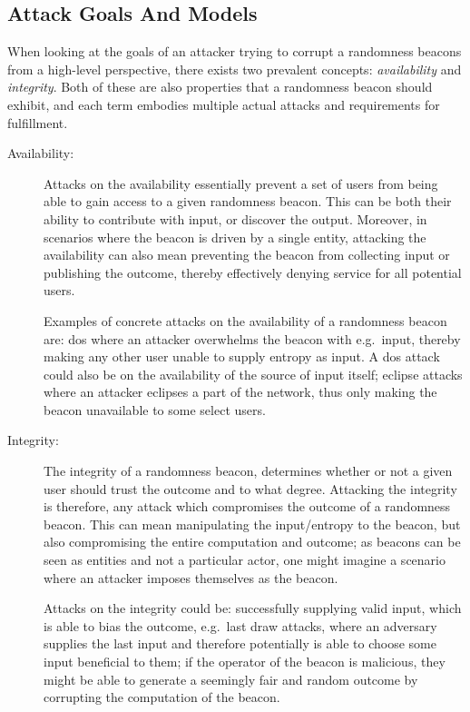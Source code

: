 \subsection{Attack Goals And Models}
\label{sub:attack_goals_and_models}
When looking at the goals of an attacker trying to corrupt a randomness beacons from a high-level perspective, there exists two prevalent concepts: \emph{availability} and \emph{integrity}.
Both of these are also properties that a randomness beacon should exhibit, and each term embodies multiple actual attacks and requirements for fulfillment.

\begin{description}
    \item[Availability:]
        Attacks on the availability essentially prevent a set of users from being able to gain access to a given randomness beacon.
        This can be both their ability to contribute with input, or discover the output.
        Moreover, in scenarios where the beacon is driven by a single entity, attacking the availability can also mean preventing the beacon from collecting input or publishing the outcome, thereby effectively denying service for all potential users.

        Examples of concrete attacks on the availability of a randomness beacon are:
        \acrfull{dos} where an attacker overwhelms the beacon with e.g.\ input, thereby making any other user unable to supply entropy as input. A \gls{dos} attack could also be on the availability of the source of input itself; eclipse attacks where an attacker eclipses a part of the network, thus only making the beacon unavailable to some select users.
    \item[Integrity:]
        The integrity of a randomness beacon, determines whether or not a given user should trust the outcome and to what degree.
        Attacking the integrity is therefore, any attack which compromises the outcome of a randomness beacon.
        This can mean manipulating the input/entropy to the beacon, but also compromising the entire computation and outcome;
        as beacons can be seen as entities and not a particular actor, one might imagine a scenario where an attacker imposes themselves as the beacon.

        Attacks on the integrity could be: successfully supplying valid input, which is able to bias the outcome, e.g.\ last draw attacks, where an adversary supplies the last input and therefore potentially is able to choose some input beneficial to them; if the operator of the beacon is malicious, they might be able to generate a seemingly fair and random outcome by corrupting the computation of the beacon.
\end{description}


